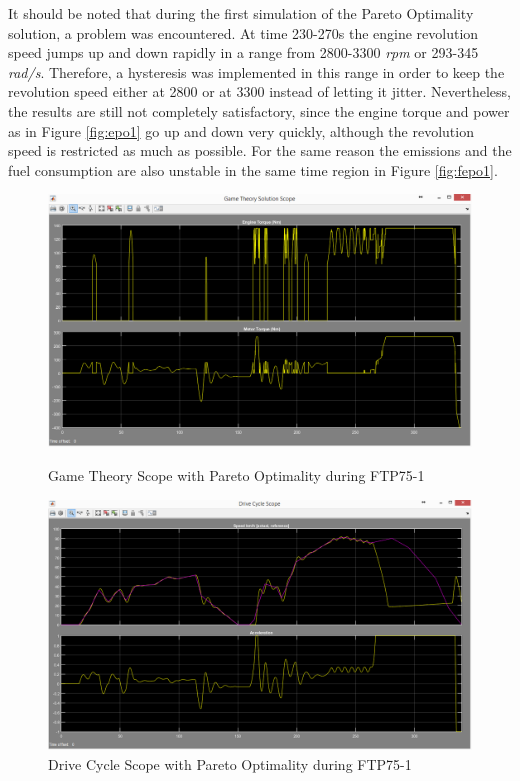 It should be noted that during the first simulation of the Pareto Optimality solution, a problem was encountered. At time 230-270s the engine revolution speed jumps up and down rapidly in a range from 2800-3300 \textit{rpm} or 293-345 \textit{rad/s}. Therefore, a hysteresis was implemented in this range in order to keep the revolution speed either at 2800 or at 3300 instead of letting it jitter. Nevertheless, the results are still not completely satisfactory, since the engine torque and power as in Figure \ref{fig:epo1} go up and down very quickly, although the revolution speed is restricted as much as possible. For the same reason the emissions and the fuel consumption are also unstable in the same time region in Figure \ref{fig:fepo1}.

\begin{figure}[hp]
\centering
\includegraphics[scale=0.45]{figures/Pareto/FTP75-1/gameTheory30Juni}
\caption{Game Theory Scope with Pareto Optimality during FTP75-1}
\label{fig:gtpo1}
\includegraphics[scale=0.41]{figures/Pareto/FTP75-1/driveCycle30Juni}
\caption{Drive Cycle Scope with Pareto Optimality during FTP75-1}
\label{fig:dcpo1}
\end{figure}


